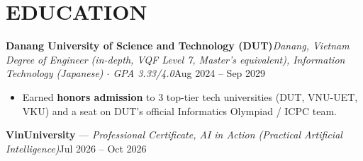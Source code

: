 \documentclass[10pt,a4paper]{article}
\newcommand{\role}[4]{%
  {\bfseries\color{ink}#1}\hfill{\itshape\color{muted}\small #2}\\[-0.6pt]
  {\itshape\small\color{ink}#3}\hfill{\small\color{muted}#4}\par\vspace{0.4pt}%
}
\begin{document}
\section{EDUCATION}
\role{Danang University of Science and Technology (DUT)}{Danang, Vietnam}
{Degree of Engineer (in-depth, VQF Level 7, Master's equivalent), Information Technology (Japanese) $\cdot$ GPA 3.33/4.0}{Aug 2024 -- Sep 2029}
\begin{itemize}
  \item \small Earned \textbf{honors admission} to 3 top-tier tech universities (DUT, VNU-UET, VKU) and a seat on DUT's official Informatics Olympiad / ICPC team.
\end{itemize}

{\bfseries\color{ink}VinUniversity} --- {\itshape\small\color{ink}Professional Certificate, AI in Action (Practical Artificial Intelligence)}\hfill{\small\color{muted}Jul 2026 -- Oct 2026}\par\vspace{0.4pt}
\end{document}
